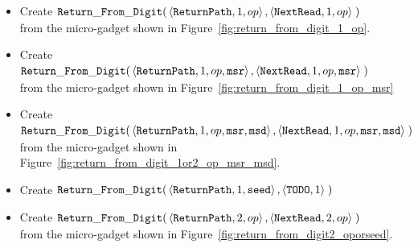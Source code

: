 \begin{itemize}

    \item Create
    $\begin{aligned}[t]
        {\tt Return\_From\_Digit}(& \left\langle {\tt ReturnPath}, 1, op \right\rangle,
                           \left\langle {\tt NextRead},        1, op \right\rangle \;)
    \end{aligned}$\\from the micro-gadget shown in Figure~\ref{fig:return_from_digit_1_op}.

    \item Create
    $\begin{aligned}[t]
        {\tt Return\_From\_Digit}(& \left\langle {\tt ReturnPath}, 1, op, {\tt msr} \right\rangle,
                           \left\langle {\tt NextRead},        1, op, {\tt msr} \right\rangle \;)
    \end{aligned}$\\from the micro-gadget shown in Figure~\ref{fig:return_from_digit_1_op_msr}

    \item Create
    $\begin{aligned}[t]
        {\tt Return\_From\_Digit}(& \left\langle {\tt ReturnPath}, 1, op, {\tt msr}, {\tt msd} \right\rangle,
                           \left\langle {\tt NextRead},        1, op, {\tt msr}, {\tt msd} \right\rangle \;)
    \end{aligned}$\\from the micro-gadget shown in Figure~\ref{fig:return_from_digit_1or2_op_msr_msd}.

    \item Create
    $\begin{aligned}[t]
        {\tt Return\_From\_Digit}(& \left\langle {\tt ReturnPath}, 1, {\tt seed}\right\rangle,
                           \left\langle {\tt TODO},            1            \right\rangle \;)
    \end{aligned}$



    \item Create
    $\begin{aligned}[t]
        {\tt Return\_From\_Digit}(& \left\langle {\tt ReturnPath},    2, op \right\rangle,
                           \left\langle {\tt NextRead}, 2, op \right\rangle \;)
    \end{aligned}$\\from the micro-gadget shown in Figure~\ref{fig:return_from_digit2_oporseed}.


\end{itemize}
